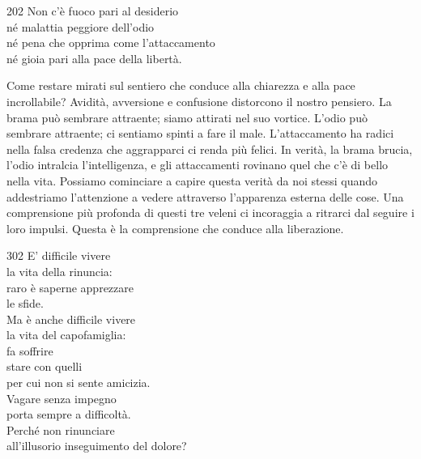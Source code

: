 
\begin{dhpVerse}{202}
\label{dhp-202}
Non c'\`{e} fuoco pari al desiderio\\
n\'{e} malattia peggiore dell'odio\\
n\'{e} pena che opprima come l'attaccamento\\
n\'{e} gioia pari alla pace della libert\`{a}.
\end{dhpVerse}

\begin{dhpRefl}
Come restare mirati sul sentiero che conduce alla chiarezza e alla pace incrollabile? Avidit\`{a}, avversione e confusione distorcono il nostro pensiero. La brama pu\`{o} sembrare attraente; siamo attirati nel suo vortice. L'odio pu\`{o} sembrare attraente; ci sentiamo spinti a fare il male. L'attaccamento ha radici nella falsa credenza che aggrapparci ci renda più felici. In verit\`{a}, la brama brucia, l'odio intralcia l'intelligenza, e gli attaccamenti rovinano quel che c'\`{e} di bello nella vita. Possiamo cominciare a capire questa verit\`{a} da noi stessi quando addestriamo l'attenzione a vedere attraverso l'apparenza esterna delle cose. Una comprensione più profonda di questi tre veleni ci incoraggia a ritrarci dal seguire i loro impulsi. Questa \`{e} la comprensione che conduce alla liberazione.
\end{dhpRefl}


\begin{dhpVerse}{302}
\label{dhp-302}
E' difficile vivere\\
la vita della rinuncia:\\
raro \`{e} saperne apprezzare\\
le sfide.\\
Ma \`{e} anche difficile vivere\\
la vita del capofamiglia:\\
fa soffrire\\
stare con quelli\\
per cui non si sente amicizia.\\
Vagare senza impegno\\
porta sempre a difficolt\`{a}.\\
Perch\'{e} non rinunciare\\
all'illusorio inseguimento del dolore?
\end{dhpVerse}

